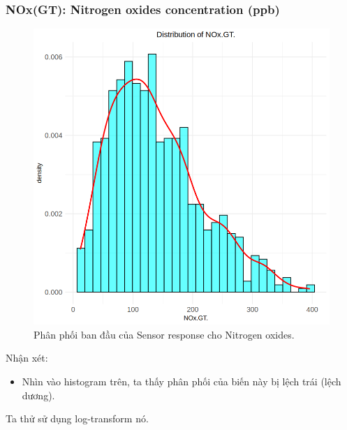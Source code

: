 \subsubsection{NOx(GT): Nitrogen oxides concentration (ppb)}

\begin{figure}[H]
    \centering
    \includegraphics[width=0.75\columnwidth]{air_figures/NOx(GT)_original_distribution.png}
    \caption{Phân phối ban đầu của Sensor response cho Nitrogen oxides.}
    \label{fig:nox_original_distribution}
\end{figure}

Nhận xét:
\begin{itemize}
    \item Nhìn vào histogram trên, ta thấy phân phối của biến này bị lệch trái (lệch dương).
\end{itemize}

Ta thử sử dụng log-transform nó.

